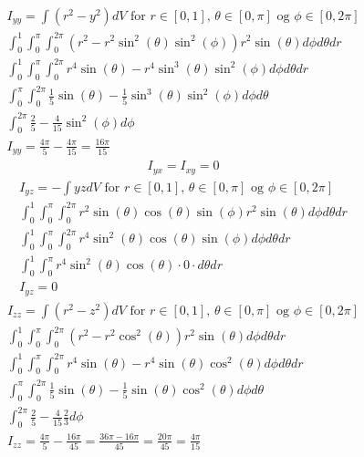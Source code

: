 \documentclass[11pt, A4paper,norsk]{article}
\begin{document}
				\begin{gather*}
I_{y y} = \int (r^2 - y^2) dV \text{ for $r \in [0, 1]$, $\theta \in [0, \pi]$ og $\phi \in [0, 2 \pi]$} \\
\int_{0}^{1} \int_{0}^{\pi} \int_{0}^{2 \pi} ( r^2 - r^2 \sin^2(\theta) \sin^2(\phi) ) r^2 \sin(\theta) d\phi d\theta dr \\
\int_{0}^{1} \int_{0}^{\pi} \int_{0}^{2 \pi} r^4 \sin(\theta) - r^4 \sin^3(\theta) \sin^2(\phi) d\phi d\theta dr \\
\int_{0}^{\pi} \int_{0}^{2 \pi} \frac{1}{5} \sin(\theta) - \frac{1}{5} \sin^3(\theta) \sin^2(\phi) d\phi d\theta \\
\int_{0}^{2 \pi} \frac{2}{5} - \frac{4}{15} \sin^2(\phi) d\phi \\
I_{y y} = \frac{4 \pi}{5} - \frac{4 \pi}{15} = \frac{16 \pi}{15}
				\end{gather*}
				\begin{gather*}
I_{y x} = I_{x y} = 0
				\end{gather*}
				\begin{gather*}
I_{y z} = - \int yz dV \text{ for $r \in [0, 1]$, $\theta \in [0, \pi]$ og $\phi \in [0, 2 \pi]$} \\
\int_{0}^{1} \int_{0}^{\pi} \int_{0}^{2 \pi} r^2 \sin(\theta) \cos(\theta) \sin(\phi) r^2 \sin(\theta) d\phi d\theta dr \\
\int_{0}^{1} \int_{0}^{\pi} \int_{0}^{2 \pi} r^4 \sin^2(\theta) \cos(\theta) \sin(\phi) d\phi d\theta dr \\
\int_{0}^{1} \int_{0}^{\pi} r^4 \sin^2(\theta) \cos(\theta) \cdot 0 \cdot d\theta dr \\
I_{y z} = 0
				\end{gather*}
				\begin{gather*}
I_{z z} = \int (r^2 - z^2) dV \text{ for $r \in [0, 1]$, $\theta \in [0, \pi]$ og $\phi \in [0, 2 \pi]$} \\
\int_{0}^{1} \int_{0}^{\pi} \int_{0}^{2 \pi} ( r^2 - r^2 \cos^2(\theta) ) r^2 \sin(\theta) d\phi d\theta dr \\
\int_{0}^{1} \int_{0}^{\pi} \int_{0}^{2 \pi} r^4 \sin(\theta) - r^4 \sin(\theta) \cos^2(\theta) d\phi d\theta dr \\
\int_{0}^{\pi} \int_{0}^{2 \pi} \frac{1}{5} \sin(\theta) - \frac{1}{5} \sin(\theta) \cos^2(\theta) d\phi d\theta \\
\int_{0}^{2 \pi} \frac{2}{5} - \frac{4}{15} \frac{2}{3} d\phi \\
I_{z z} = \frac{4 \pi}{5} - \frac{16 \pi}{45} = \frac{36 \pi - 16 \pi}{45} = \frac{20 \pi}{45} = \frac{4 \pi}{15}
				\end{gather*}
\end{document}
